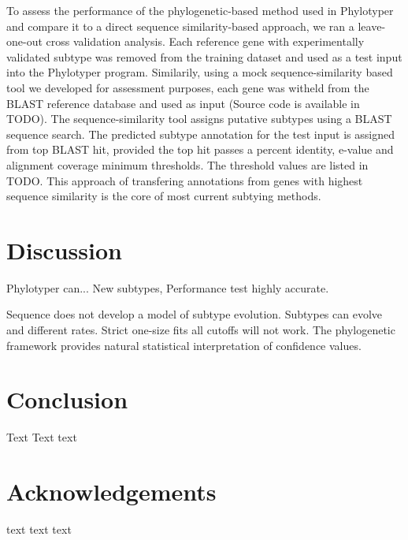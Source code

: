 \documentclass{bioinfo}
\begin{document}
To assess the performance of the phylogenetic-based method used in Phylotyper and compare it to a direct sequence similarity-based approach, we ran a leave-one-out cross validation analysis. 
Each reference gene with experimentally validated subtype was removed from the training dataset and used as a test input into the Phylotyper program. 
Similarily, using a mock sequence-similarity based tool we developed for assessment purposes, each gene was witheld from the BLAST reference database and used as input (Source code is available in TODO).
The sequence-similarity tool assigns putative subtypes using a BLAST sequence search.  
The predicted subtype annotation for the test input is assigned from top BLAST hit, provided the top hit passes a percent identity, e-value and alignment coverage minimum thresholds.  
The threshold values are listed in TODO.
This approach of transfering annotations from genes with highest sequence similarity is the core of most current subtying methods.


\section{Discussion}

Phylotyper can...
New subtypes,
Performance test highly accurate.

Sequence does not develop a model of subtype evolution. 
Subtypes can evolve and different rates. 
Strict one-size fits all cutoffs will not work.  
The phylogenetic framework provides natural statistical interpretation of confidence values.



%
%


\section{Conclusion}

Text Text text\vspace*{-10pt}


\section*{Acknowledgements}

text text text\vspace*{-12pt}
\end{document}
